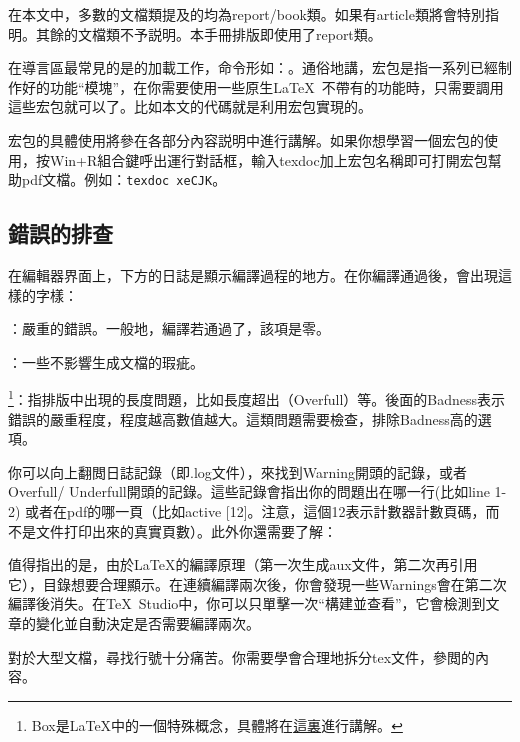 在本文中，多數的文檔類提及的均為report/book類。如果有article類將會特別指明。其餘的文檔類不予説明。本手冊排版即使用了report類。\dpar

在導言區最常見的是的加載工作，命令形如：。通俗地講，宏包是指一系列已經制作好的功能``模塊''，在你需要使用一些原生\LaTeX\ 不帶有的功能時，只需要調用這些宏包就可以了。比如本文的代碼就是利用宏包實現的。

宏包的具體使用將參在各部分內容説明中進行講解。如果你想學習一個宏包的使用，按Win+R組合鍵呼出運行對話框，輸入texdoc加上宏包名稱即可打開宏包幫助pdf文檔。例如：\verb|texdoc xeCJK|。


\subsection{錯誤的排查}
\label{subsec:debug}
在編輯器界面上，下方的日誌是顯示編譯過程的地方。在你編譯通過後，會出現這樣的字樣：
\begin{feai}
	\item {}：嚴重的錯誤。一般地，編譯若通過了，該項是零。
	\item {}：一些不影響生成文檔的瑕疵。
	\item {\footnote{Box是\LaTeX{}中的一個特殊概念，具體將在\hyperref[sec:box]{這裏}進行講解。}}：指排版中出現的長度問題，比如長度超出（Overfull）等。後面的Badness表示錯誤的嚴重程度，程度越高數值越大。這類問題需要檢查，排除Badness高的選項。
\end{feai}

你可以向上翻閲日誌記錄（即.log文件），來找到Warning開頭的記錄，或者Overfull/ Underfull開頭的記錄。這些記錄會指出你的問題出在哪一行(比如line 1-2) 或者在pdf的哪一頁（比如active [12]。注意，這個12表示計數器計數頁碼，而不是文件打印出來的真實頁數）。此外你還需要了解：
\begin{feai}
	\item 值得指出的是，由於\LaTeX{}的編譯原理（第一次生成aux文件，第二次再引用它），目錄想要合理顯示。在連續編譯兩次後，你會發現一些Warnings會在第二次編譯後消失。在\TeX\ Studio中，你可以只單擊一次“構建並查看”，它會檢測到文章的變化並自動決定是否需要編譯兩次。
	\item 對於大型文檔，尋找行號十分痛苦。你需要學會合理地拆分tex文件，參閲的內容。
\end{feai}

